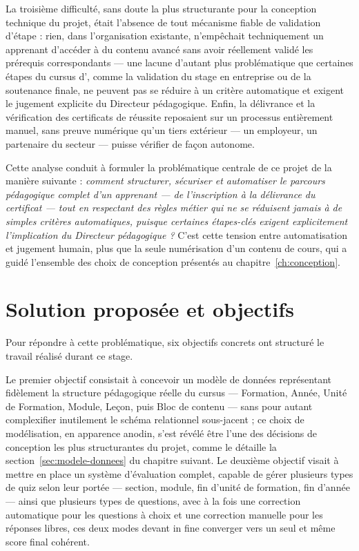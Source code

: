 La troisième difficulté, sans doute la plus structurante pour la
conception technique du projet, était l'absence de tout mécanisme fiable
de validation d'étape : rien, dans l'organisation existante, n'empêchait
techniquement un apprenant d'accéder à du contenu avancé sans avoir
réellement validé les prérequis correspondants --- une lacune d'autant
plus problématique que certaines étapes du cursus d'\Entreprise, comme la
validation du stage en entreprise ou de la soutenance finale, ne peuvent
pas se réduire à un critère automatique et exigent le jugement explicite
du Directeur pédagogique. Enfin, la délivrance et la vérification des
certificats de réussite reposaient sur un processus entièrement manuel,
sans preuve numérique qu'un tiers extérieur --- un employeur, un
partenaire du secteur --- puisse vérifier de façon autonome.

Cette analyse conduit à formuler la problématique centrale de ce projet de
la manière suivante : \emph{comment structurer, sécuriser et automatiser
le parcours pédagogique complet d'un apprenant --- de l'inscription à la
délivrance du certificat --- tout en respectant des règles métier qui ne
se réduisent jamais à de simples critères automatiques, puisque certaines
étapes-clés exigent explicitement l'implication du Directeur
pédagogique ?} C'est cette tension entre automatisation et jugement
humain, plus que la seule numérisation d'un contenu de cours, qui a guidé
l'ensemble des choix de conception présentés au
chapitre~\ref{ch:conception}.

\section{Solution proposée et objectifs}

Pour répondre à cette problématique, six objectifs concrets ont structuré
le travail réalisé durant ce stage.

Le premier objectif consistait à concevoir un modèle de données
représentant fidèlement la structure pédagogique réelle du cursus ---
Formation, Année, Unité de Formation, Module, Leçon, puis Bloc de contenu
--- sans pour autant complexifier inutilement le schéma relationnel sous-jacent ;
ce choix de modélisation, en apparence anodin, s'est révélé être l'une des
décisions de conception les plus structurantes du projet, comme le détaille
la section~\ref{sec:modele-donnees} du chapitre suivant. Le deuxième
objectif visait à mettre en place un système d'évaluation complet, capable
de gérer plusieurs types de quiz selon leur portée --- section, module, fin
d'unité de formation, fin d'année --- ainsi que plusieurs types de
questions, avec à la fois une correction automatique pour les questions à
choix et une correction manuelle pour les réponses libres, ces deux modes
devant in fine converger vers un seul et même score final cohérent.

